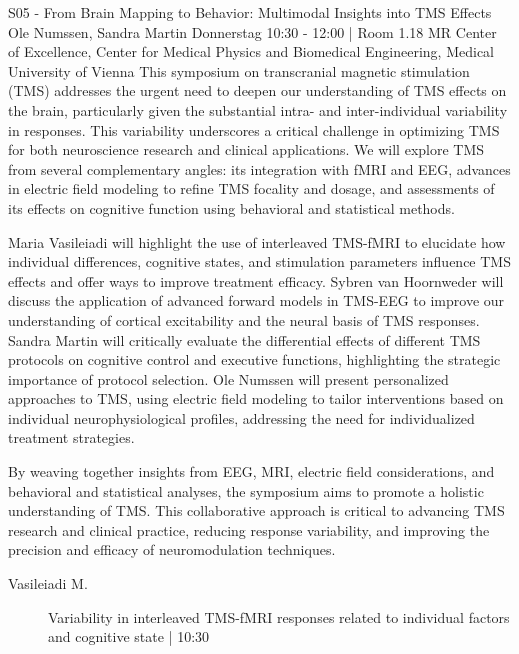 
            \begin{symposium}
            {S05 - From Brain Mapping to Behavior: Multimodal Insights into TMS Effects}
            { Ole Numssen, Sandra Martin}
            {Donnerstag 10:30 - 12:00 | Room 1.18}
            {MR Center of Excellence, Center for Medical Physics and Biomedical Engineering, Medical University of Vienna}
            This symposium on transcranial magnetic stimulation (TMS) addresses the urgent need to deepen our understanding of TMS effects on the brain, particularly given the substantial intra- and inter-individual variability in responses. This variability underscores a critical challenge in optimizing TMS for both neuroscience research and clinical applications. We will explore TMS from several complementary angles: its integration with fMRI and EEG, advances in electric field modeling to refine TMS focality and dosage, and assessments of its effects on cognitive function using behavioral and statistical methods.

Maria Vasileiadi will highlight the use of interleaved TMS-fMRI to elucidate how individual differences, cognitive states, and stimulation parameters influence TMS effects and offer ways to improve treatment efficacy. Sybren van Hoornweder will discuss the application of advanced forward models in TMS-EEG to improve our understanding of cortical excitability and the neural basis of TMS responses. Sandra Martin will critically evaluate the differential effects of different TMS protocols on cognitive control and executive functions, highlighting the strategic importance of protocol selection. Ole Numssen will present personalized approaches to TMS, using electric field modeling to tailor interventions based on individual neurophysiological profiles, addressing the need for individualized treatment strategies.

By weaving together insights from EEG, MRI, electric field considerations, and behavioral and statistical analyses, the symposium aims to promote a holistic understanding of TMS. This collaborative approach is critical to advancing TMS research and clinical practice, reducing response variability, and improving the precision and efficacy of neuromodulation techniques.
            \begin{description}    
            
                \item [ Vasileiadi M.] Variability in interleaved TMS­-fMRI responses related to individual factors and cognitive state \textcolor{mygray}{ | 10:30}    
                

\end{description}
\end{symposium}
